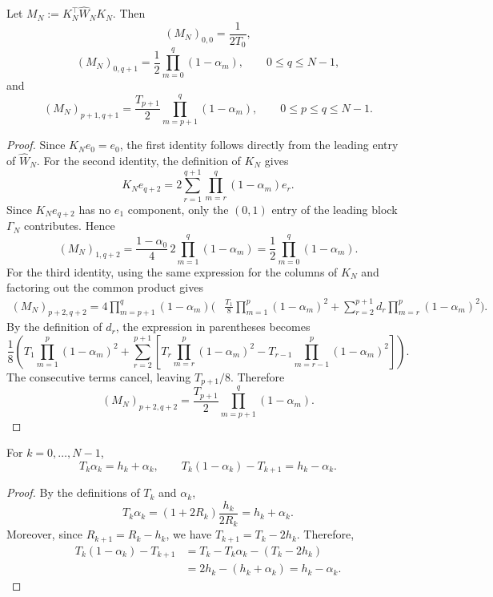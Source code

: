 \documentclass[11pt, hidelinks]{article}
\begin{document}
\begin{lemma}\label{lem:gram-kernel}
Let $M_N:=K_N^\top\widehat W_NK_N$. Then
\[(M_N)_{0,0}=\frac{1}{2T_0},\]
\[(M_N)_{0,q+1}=\frac12\prod_{m=0}^{q}(1-\alpha_m), \qquad 0\le q\le N-1,\]
and
\[(M_N)_{p+1,q+1} =\frac{T_{p+1}}2\prod_{m=p+1}^{q}(1-\alpha_m),\qquad 0\le p\le q\le N-1.\]
\end{lemma}
\begin{proof}
Since $K_Ne_0=e_0$, the first identity follows directly from the leading entry of $\widehat W_N$.
For the second identity, the definition of $K_N$ gives
\[K_Ne_{q+2}=2\sum_{r=1}^{q+1}\prod_{m=r}^{q}(1-\alpha_m)e_{r}. \]
Since $K_Ne_{q+2}$ has no $e_1$ component, only the $(0,1)$ entry of the leading block $\Gamma_N$ contributes. Hence
\[(M_N)_{1,q+2}=\frac{1-\alpha_0}{4}\,2\prod_{m=1}^{q}(1-\alpha_m)
=\frac12\prod_{m=0}^{q}(1-\alpha_m). \]
For the third identity, using the same expression for the columns of $K_N$ and factoring out the common product gives
\[\begin{aligned} (M_N)_{p+2,q+2}=4\prod_{m=p+1}^{q}(1-\alpha_m)\Bigg( &\frac{T_1}{8}\prod_{m=1}^{p}(1-\alpha_m)^2 +\sum_{r=2}^{p+1}d_r\prod_{m=r}^{p}(1-\alpha_m)^2 \Bigg). \end{aligned} \]
By the definition of $d_r$, the expression in parentheses becomes
\[\frac18\left( T_1\prod_{m=1}^{p}(1-\alpha_m)^2 +\sum_{r=2}^{p+1}
\left[T_r\prod_{m=r}^{p}(1-\alpha_m)^2 -T_{r-1}\prod_{m=r-1}^{p}(1-\alpha_m)^2\right] \right). \]
The consecutive terms cancel, leaving $T_{p+1}/8$. Therefore
\[(M_N)_{p+2,q+2}
=\frac{T_{p+1}}2\prod_{m=p+1}^{q}(1-\alpha_m). \]
\end{proof}
\begin{lemma}\label{lem:T-alpha}
For $k=0,\ldots,N-1$,
\[ T_k\alpha_k=h_k+\alpha_k, \qquad T_k(1-\alpha_k)-T_{k+1}=h_k-\alpha_k.
\]
\end{lemma}
\begin{proof}
By the definitions of $T_k$ and $\alpha_k$,
\[ T_k\alpha_k=(1+2R_k)\frac{h_k}{2R_k}=h_k+\alpha_k. \]
Moreover, since $R_{k+1}=R_k-h_k$, we have $T_{k+1}=T_k-2h_k$. Therefore,
\[ \begin{aligned}
T_k(1-\alpha_k)-T_{k+1}
&=T_k-T_k\alpha_k-(T_k-2h_k)\\
&=2h_k-(h_k+\alpha_k)
=h_k-\alpha_k.
\end{aligned} \]
\end{proof}
\end{document}
